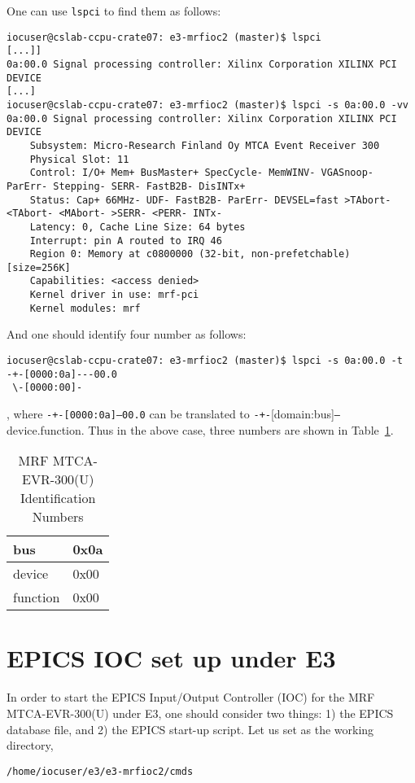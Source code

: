 \documentclass[11pt
  , a4paper
  , article
  , oneside
  , showtrims
]{memoir}
\begin{document}
{One can use \texttt{lspci} to find them as follows:
\begin{lstlisting}[style=termstyle]
iocuser@cslab-ccpu-crate07: e3-mrfioc2 (master)$ lspci
[...]]
0a:00.0 Signal processing controller: Xilinx Corporation XILINX PCI DEVICE
[...]
iocuser@cslab-ccpu-crate07: e3-mrfioc2 (master)$ lspci -s 0a:00.0 -vv
0a:00.0 Signal processing controller: Xilinx Corporation XILINX PCI DEVICE
	Subsystem: Micro-Research Finland Oy MTCA Event Receiver 300
	Physical Slot: 11
	Control: I/O+ Mem+ BusMaster+ SpecCycle- MemWINV- VGASnoop- ParErr- Stepping- SERR- FastB2B- DisINTx+
	Status: Cap+ 66MHz- UDF- FastB2B- ParErr- DEVSEL=fast >TAbort- <TAbort- <MAbort- >SERR- <PERR- INTx-
	Latency: 0, Cache Line Size: 64 bytes
	Interrupt: pin A routed to IRQ 46
	Region 0: Memory at c0800000 (32-bit, non-prefetchable) [size=256K]
	Capabilities: <access denied>
	Kernel driver in use: mrf-pci
	Kernel modules: mrf

\end{lstlisting}

And one should identify four number as follows:
\begin{lstlisting}[style=termstyle]
iocuser@cslab-ccpu-crate07: e3-mrfioc2 (master)$ lspci -s 0a:00.0 -t
-+-[0000:0a]---00.0
 \-[0000:00]-
\end{lstlisting}
, where \texttt{-+-[0000:0a]---00.0} can be translated to \texttt{-+-}[domain:bus]\texttt{---}device.function. Thus in the above case, three numbers are shown in Table~\ref{table:pciidnumber}.\begin{table}[!htb]
  \centering
  \begin{tabular}{l|l}
    \toprule
    bus      & 0x0a \\\midrule
    device   & 0x00 \\\midrule
    function & 0x00 \\\bottomrule
  \end{tabular}
  \caption[]{MRF MTCA-EVR-300(U) Identification Numbers}
  \label{table:pciidnumber}
\end{table}


\section{EPICS IOC set up under E3}
In order to start the EPICS Input/Output Controller (IOC) for the MRF MTCA-EVR-300(U) under E3, one should consider two things: 1) the EPICS database file, and 2) the EPICS start-up script. Let us set as the working directory,
\begin{lstlisting}[style=termstyle, label={list:pwd}, caption={Working directory in the ICS lab.} ]
/home/iocuser/e3/e3-mrfioc2/cmds
\end{lstlisting}

}
\end{document}
